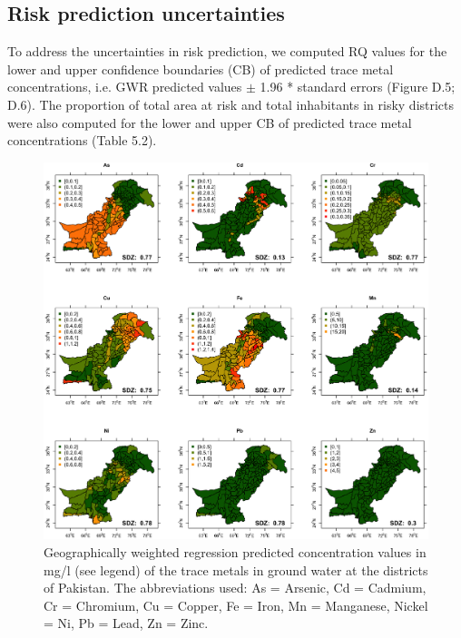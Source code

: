 \subsection{Risk prediction uncertainties}
\label{Risk prediction uncertainties}

To address the uncertainties in risk prediction, we computed RQ values for the lower and upper confidence boundaries (CB) of predicted trace metal concentrations, i.e. GWR predicted values $\pm$ 1.96 * standard errors (Figure D.5; D.6). The proportion of total area at risk and total inhabitants in risky districts were also computed for the lower and upper CB of predicted trace metal concentrations (Table 5.2).

\begin{figure}[t]
  \centering
  \includegraphics[width=\textwidth]{Figures/Fig_5_2.png}
  \caption{Geographically weighted regression predicted concentration values in mg/l (see legend) of the trace metals in ground water at the districts of Pakistan.  The abbreviations used: As = Arsenic, Cd = Cadmium, Cr = Chromium, Cu = Copper, Fe = Iron, Mn = Manganese, Nickel = Ni, Pb = Lead, Zn = Zinc.}
  \label{Fig_5_2}
\end{figure}

